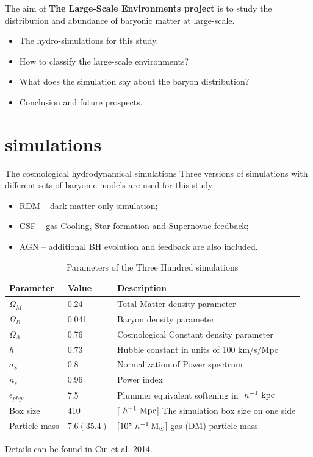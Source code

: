 \documentclass[aspectratio=169]{beamer}
\newcommand{\hMsun}{~h^{-1}\>{\rm M_\odot}}
\newcommand{\Mpc}{~h^{-1}~{\rm Mpc}}
\newcommand{\Kpc}{~h^{-1}~{\rm kpc}}
\begin{document}
\begin{frame}[plain,c]
  \Large{The aim of {\bf The Large-Scale Environments project} is to study the distribution and abundance of baryonic matter at large-scale.}
  
  \bigskip
  
  \begin{itemize}
    \item<2-> The hydro-simulations for this study.
    \item<3-> How to classify the large-scale environments?
    \item<4-> What does the simulation say about the baryon distribution?
    \item<5-> Conclusion and future prospects.
  \end{itemize}
\end{frame}

\section{simulations}
\begin{frame}{The cosmological hydrodynamical simulations}
Three versions of simulations with different sets of baryonic models are used for this study:
\begin{itemize}
    \item RDM -- dark-matter-only simulation; 
    \item CSF -- gas Cooling, Star formation and Supernovae feedback;
    \item AGN -- additional BH evolution and feedback are also included.
\end{itemize}
\vspace{-0.6cm}
\begin{table}
\fontsize{9}{9}\selectfont
\caption{Parameters of the Three Hundred simulations}
\begin{tabular}{lll}
  \hline
  Parameter& Value & Description\\
  \hline
  $\Omega_M$ & 0.24 & Total Matter density parameter\\
  $\Omega_B$ & 0.041 & Baryon density parameter\\
  $\Omega_\Lambda$ & 0.76 & Cosmological Constant density parameter\\
  $h$ & 0.73  & Hubble constant in units of 100 km/s/Mpc\\
  $\sigma_8$ & 0.8 & Normalization of Power spectrum\\
  $n_s$ & 0.96  & Power index\\
  $\epsilon_{phys}$ & 7.5 & Plummer equivalent softening in $\Kpc$ \\
  Box size & \alert{410} & [$\Mpc$] The simulation box size on one side \\
  Particle mass & $7.6 (35.4) $ & [$10^8 \hMsun$] gas (DM) particle mass \\
  \hline
\end{tabular}
\end{table}
Details can be found in Cui et al. 2014.
\end{frame}
\end{document}
